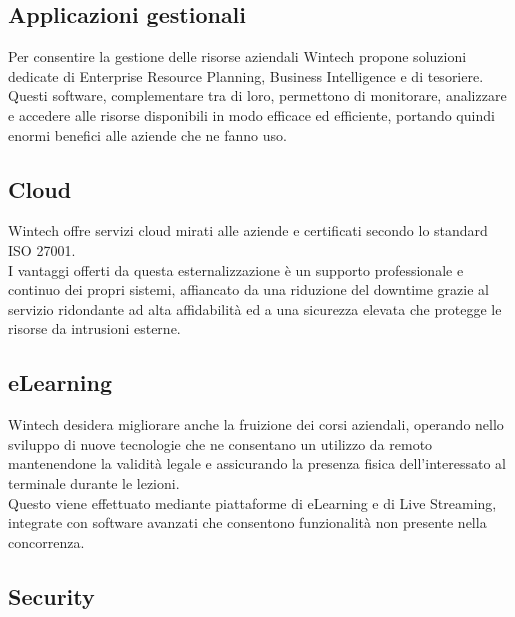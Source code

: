 \documentclass[Tesi.tex]{subfiles}
\begin{document}
\subsection{Applicazioni gestionali}
Per consentire la gestione delle risorse aziendali Wintech propone soluzioni dedicate di Enterprise Resource Planning, Business Intelligence e di tesoriere. \\
Questi software, complementare tra di loro, permettono di monitorare, analizzare e accedere alle risorse disponibili in modo efficace ed efficiente, portando quindi enormi benefici alle aziende che ne fanno uso.

\subsection{Cloud}
Wintech offre servizi cloud mirati alle aziende e certificati secondo lo standard ISO 27001. \\
I vantaggi offerti da questa esternalizzazione è un supporto professionale e continuo dei propri sistemi, affiancato da una riduzione del downtime grazie al servizio ridondante ad alta affidabilità ed a una sicurezza elevata che protegge le risorse da intrusioni esterne.

\subsection{eLearning}
Wintech desidera migliorare anche la fruizione dei corsi aziendali, operando nello sviluppo di nuove tecnologie che ne consentano un utilizzo da remoto mantenendone la validità legale e assicurando la presenza fisica dell'interessato al terminale durante le lezioni. \\
Questo viene effettuato mediante piattaforme di eLearning e di Live Streaming, integrate con software avanzati che consentono funzionalità non presente nella concorrenza.

\subsection{Security}
\end{document}
